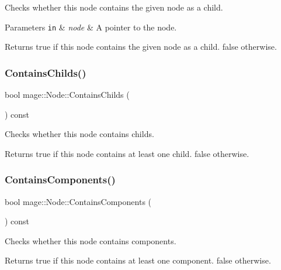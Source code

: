 Checks whether this node contains the given node as a child.


\begin{DoxyParams}[1]{Parameters}
\mbox{\tt in}  & {\em node} & A pointer to the node. \\
\hline
\end{DoxyParams}
\begin{DoxyReturn}{Returns}
{\ttfamily true} if this node contains the given node as a child. {\ttfamily false} otherwise. 
\end{DoxyReturn}
\mbox{\label{classmage_1_1_node_afd885043a9de1b0c09d1eb0ef7bf6006}} 
\subsubsection{\texorpdfstring{Contains\+Childs()}{ContainsChilds()}}
{\footnotesize\ttfamily bool mage\+::\+Node\+::\+Contains\+Childs (\begin{DoxyParamCaption}{ }\end{DoxyParamCaption}) const}

Checks whether this node contains childs.

\begin{DoxyReturn}{Returns}
{\ttfamily true} if this node contains at least one child. {\ttfamily false} otherwise. 
\end{DoxyReturn}
\mbox{\label{classmage_1_1_node_aafb492896751b5b60ba5ddaeecbdd719}} 
\subsubsection{\texorpdfstring{Contains\+Components()}{ContainsComponents()}}
{\footnotesize\ttfamily bool mage\+::\+Node\+::\+Contains\+Components (\begin{DoxyParamCaption}{ }\end{DoxyParamCaption}) const\hspace{0.3cm}{\ttfamily [noexcept]}}

Checks whether this node contains components.

\begin{DoxyReturn}{Returns}
{\ttfamily true} if this node contains at least one component. {\ttfamily false} otherwise. 
\end{DoxyReturn}
\mbox{\label{classmage_1_1_node_a89df078cbf010b44248a9afd3a65e89d}} 
